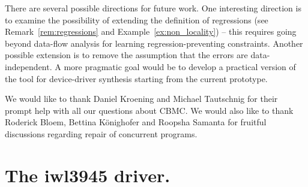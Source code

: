 \documentclass{llncs}
\begin{document}
There are several possible directions for future work. 
One interesting direction is to examine the possibility of
extending the definition of regressions (see
Remark~\ref{rem:regressions} and Example~\ref{ex:non_locality}) -- this
requires going beyond data-flow analysis for learning
regression-preventing constraints.
Another possible extension is to remove the assumption that the
errors are data-independent.
A more pragmatic goal would be to develop a practical version of the
tool for device-driver synthesis starting from the current prototype.


 We would like to thank Daniel
Kroening and Michael Tautschnig for their prompt help with all our
questions about CBMC. 
We would also like to thank Roderick Bloem, Bettina K\"onighofer and Roopsha Samanta for
fruitful discussions 
regarding repair of concurrent programs.




\newpage

\appendix

\section{The iwl3945 driver.}\label{app:driver}
\end{document}
